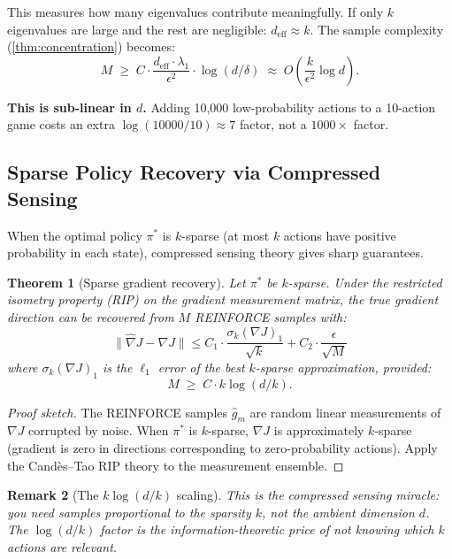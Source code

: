 \documentclass[11pt,a4paper]{article}
\newtheorem{theorem}{Theorem}[section]
\newtheorem{remark}[theorem]{Remark}
\newcommand{\norm}[1]{\|#1\|}
\begin{document}
This measures how many eigenvalues contribute meaningfully.
If only $k$ eigenvalues are large and the rest are negligible:
$d_{\text{eff}} \approx k$. The sample complexity
(\cref{thm:concentration}) becomes:
\begin{equation}
  M \;\geq\; C \cdot \frac{d_{\text{eff}} \cdot \lambda_1}{\epsilon^2}
  \cdot \log(d/\delta)
  \;\approx\; O\!\left(\frac{k}{\epsilon^2} \log d\right).
\end{equation}

\textbf{This is sub-linear in $d$.} Adding 10,000 low-probability actions
to a 10-action game costs an extra $\log(10000/10) \approx 7$ factor,
not a $1000\times$ factor.


\subsection{Sparse Policy Recovery via Compressed Sensing}

When the optimal policy $\pi^*$ is $k$-sparse (at most $k$ actions
have positive probability in each state), compressed sensing theory
gives sharp guarantees.

\begin{theorem}[Sparse gradient recovery]\label{thm:cs}
Let $\pi^*$ be $k$-sparse. Under the restricted isometry property
(RIP) on the gradient measurement matrix, the true gradient direction
can be recovered from $M$ REINFORCE samples with:
\begin{equation}\label{eq:cs-bound}
  \norm{\hat{\nabla} J - \nabla J} \leq C_1 \cdot \frac{\sigma_k(\nabla J)_1}{\sqrt{k}}
  + C_2 \cdot \frac{\epsilon}{\sqrt{M}}
\end{equation}
where $\sigma_k(\nabla J)_1$ is the $\ell_1$ error of the best
$k$-sparse approximation, provided:
\begin{equation}
  M \;\geq\; C \cdot k \log(d/k).
\end{equation}
\end{theorem}

\begin{proof}[Proof sketch]
The REINFORCE samples $\hat{g}_m$ are random linear measurements of
$\nabla J$ corrupted by noise. When $\pi^*$ is $k$-sparse, $\nabla J$
is approximately $k$-sparse (gradient is zero in directions corresponding
to zero-probability actions). Apply the Cand\`es--Tao RIP theory to the
measurement ensemble.
\end{proof}

\begin{remark}[The $k \log(d/k)$ scaling]
This is the compressed sensing miracle: you need samples proportional
to the sparsity $k$, not the ambient dimension $d$. The $\log(d/k)$
factor is the information-theoretic price of not knowing \emph{which}
$k$ actions are relevant.
\end{remark}
\end{document}
